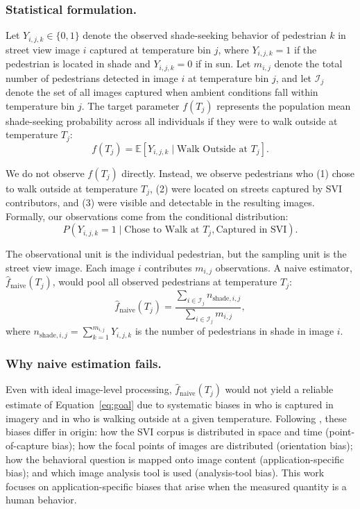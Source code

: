 \documentclass{ifacconf}
\begin{document}
  \subsubsection{Statistical formulation.} Let $Y_{i,j,k} \in \{0,1\}$ denote the observed shade-seeking behavior of pedestrian $k$ in street
  view image $i$ captured at temperature bin $j$, where $Y_{i,j,k} = 1$ if the pedestrian is located in shade and $Y_{i,j,k} = 0$ if in
  sun. Let $m_{i,j}$ denote the total number of pedestrians detected in image $i$ at temperature bin $j$, and let $\mathcal{I}_j$
  denote the set of all images captured when ambient conditions fall within temperature bin $j$. The target parameter $f(T_j)$
  represents the population mean shade-seeking probability across all individuals if they were to walk outside at temperature $T_j$:
  \begin{equation}
  f(T_j) = \mathbb{E}[Y_{i,j,k} \mid \text{Walk Outside at } T_j].
  \label{eq:estimand}
  \end{equation}

  We do not observe $f(T_j)$ directly. Instead, we observe pedestrians who (1) chose to walk outside at temperature $T_j$, (2) were
  located on streets captured by SVI contributors, and (3) were visible and detectable in the resulting images. Formally, our
  observations come from the conditional distribution:
  \begin{equation}
  P(Y_{i,j,k} = 1 \mid \text{Chose to Walk at } T_j, \text{Captured in SVI}).
  \label{eq:observed}
  \end{equation}

  The observational unit is the individual pedestrian, but the sampling unit is the street view image. Each image $i$ contributes
  $m_{i,j}$ observations. A naive estimator, $\hat{f}_{\text{naive}}(T_j)$, would pool all observed pedestrians at temperature $T_j$:
  \begin{equation}
  \hat{f}_{\text{naive}}(T_j) = \frac{\sum_{i \in \mathcal{I}_j} n_{\text{shade},i,j}}{\sum_{i \in \mathcal{I}_j} m_{i,j}},
  \label{eq:naive}
  \end{equation}
  where $n_{\text{shade},i,j} = \sum_{k=1}^{m_{i,j}} Y_{i,j,k}$ is the number of pedestrians in shade in image $i$.

  \subsubsection{Why naive estimation fails.} Even with ideal image-level processing, $\hat{f}_{\text{naive}}(T_j)$ would not yield a
  reliable estimate of Equation~\eqref{eq:goal} due to systematic biases in who is captured in imagery and in who is walking outside
  at a given temperature. Following \citet{elrod2026towards}, these biases differ in origin: how the SVI corpus is distributed in
  space and time (point-of-capture bias); how the focal points of images are distributed (orientation bias); how the behavioral
  question is mapped onto image content (application-specific bias); and which image analysis tool is used (analysis-tool bias). This
   work focuses on application-specific biases that arise when the measured quantity is a human behavior.
\end{document}

